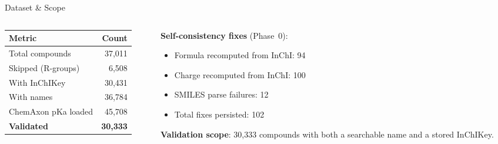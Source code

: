 \documentclass[aspectratio=169,11pt]{beamer}
\begin{document}
\begin{frame}{Dataset \& Scope}

\begin{columns}[T]
\begin{column}{0.44\textwidth}
\begin{table}[h]
\centering
\small
\begin{tabular}{lr}
\toprule
\textbf{Metric} & \textbf{Count} \\
\midrule
Total compounds          & 37,011 \\
Skipped (R-groups)       &  6,508 \\
With InChIKey            & 30,431 \\
With names               & 36,784 \\
ChemAxon pKa loaded      & 45,708 \\
\textbf{Validated}       & \textbf{30,333} \\
\bottomrule
\end{tabular}
\end{table}
\end{column}

\begin{column}{0.52\textwidth}
\textbf{Self-consistency fixes} (Phase~0):
\begin{itemize}\setlength\itemsep{1pt}
  \item Formula recomputed from InChI: 94
  \item Charge recomputed from InChI: 100
  \item SMILES parse failures: 12
  \item Total fixes persisted: 102
\end{itemize}

\medskip
\textbf{Validation scope}: 30,333 compounds with both a
searchable name and a stored InChIKey.
\end{column}
\end{columns}

\end{frame}
\end{document}
